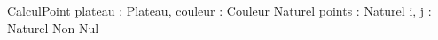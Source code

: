 \begin{algorithme}
	\small
	\fonction
	{CalculPoint}
	{plateau : Plateau, couleur : Couleur}
	{Naturel}	
	{points : Naturel
	i, j : Naturel Non Nul}
	{
	}
\end{algorithme}